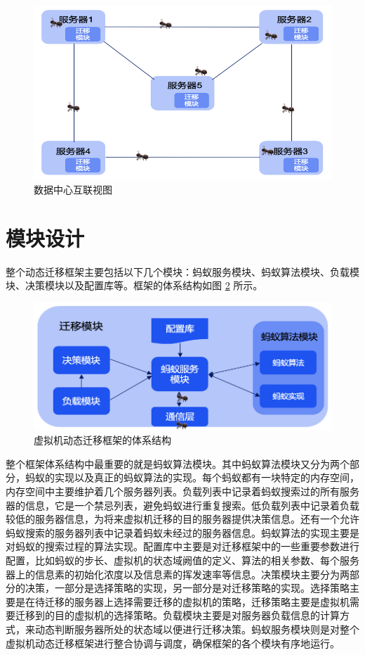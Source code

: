 \begin{figure}[htb]
  \centering
  \includegraphics{./Figure/IMG_Chap3_1.png}
  \caption{数据中心互联视图}\label{Fig:chap3_1}
\end{figure}

\section{模块设计}
整个动态迁移框架主要包括以下几个模块：蚂蚁服务模块、蚂蚁算法模块、负载模块、决策模块以及配置库等。框架的体系结构如图 \ref{Fig:chap3_2} 所示。

\begin{figure}[htb]
  \centering
  \includegraphics{./Figure/IMG_Chap3_2.png}
  \caption{虚拟机动态迁移框架的体系结构}\label{Fig:chap3_2}
\end{figure}

整个框架体系结构中最重要的就是蚂蚁算法模块。其中蚂蚁算法模块又分为两个部分，蚂蚁的实现以及真正的蚂蚁算法的实现。每个蚂蚁都有一块特定的内存空间，内存空间中主要维护着几个服务器列表。负载列表中记录着蚂蚁搜索过的所有服务器的信息，它是一个禁忌列表，避免蚂蚁进行重复搜索。低负载列表中记录着负载较低的服务器信息，为将来虚拟机迁移的目的服务器提供决策信息。还有一个允许蚂蚁搜索的服务器列表中记录着蚂蚁未经过的服务器信息。蚂蚁算法的实现主要是对蚂蚁的搜索过程的算法实现。配置库中主要是对迁移框架中的一些重要参数进行配置，比如蚂蚁的步长、虚拟机的状态域阙值的定义、算法的相关参数、每个服务器上的信息素的初始化浓度以及信息素的挥发速率等信息。决策模块主要分为两部分的决策，一部分是选择策略的实现，另一部分是对迁移策略的实现。选择策略主要是在待迁移的服务器上选择需要迁移的虚拟机的策略，迁移策略主要是虚拟机需要迁移到的目的虚拟机的选择策略。负载模块主要是对服务器负载信息的计算方式，来动态判断服务器所处的状态域以便进行迁移决策。蚂蚁服务模块则是对整个虚拟机动态迁移框架进行整合协调与调度，确保框架的各个模块有序地运行。

